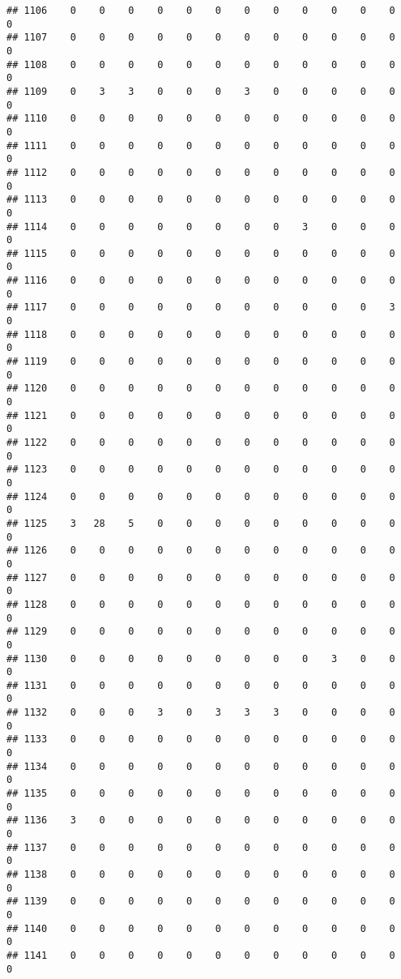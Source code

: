 \documentclass[]{article}
\begin{document}
\begin{verbatim}
## 1106    0    0    0    0    0    0    0    0    0    0    0    0    0
## 1107    0    0    0    0    0    0    0    0    0    0    0    0    0
## 1108    0    0    0    0    0    0    0    0    0    0    0    0    0
## 1109    0    3    3    0    0    0    3    0    0    0    0    0    0
## 1110    0    0    0    0    0    0    0    0    0    0    0    0    0
## 1111    0    0    0    0    0    0    0    0    0    0    0    0    0
## 1112    0    0    0    0    0    0    0    0    0    0    0    0    0
## 1113    0    0    0    0    0    0    0    0    0    0    0    0    0
## 1114    0    0    0    0    0    0    0    0    3    0    0    0    0
## 1115    0    0    0    0    0    0    0    0    0    0    0    0    0
## 1116    0    0    0    0    0    0    0    0    0    0    0    0    0
## 1117    0    0    0    0    0    0    0    0    0    0    0    3    0
## 1118    0    0    0    0    0    0    0    0    0    0    0    0    0
## 1119    0    0    0    0    0    0    0    0    0    0    0    0    0
## 1120    0    0    0    0    0    0    0    0    0    0    0    0    0
## 1121    0    0    0    0    0    0    0    0    0    0    0    0    0
## 1122    0    0    0    0    0    0    0    0    0    0    0    0    0
## 1123    0    0    0    0    0    0    0    0    0    0    0    0    0
## 1124    0    0    0    0    0    0    0    0    0    0    0    0    0
## 1125    3   28    5    0    0    0    0    0    0    0    0    0    0
## 1126    0    0    0    0    0    0    0    0    0    0    0    0    0
## 1127    0    0    0    0    0    0    0    0    0    0    0    0    0
## 1128    0    0    0    0    0    0    0    0    0    0    0    0    0
## 1129    0    0    0    0    0    0    0    0    0    0    0    0    0
## 1130    0    0    0    0    0    0    0    0    0    3    0    0    0
## 1131    0    0    0    0    0    0    0    0    0    0    0    0    0
## 1132    0    0    0    3    0    3    3    3    0    0    0    0    0
## 1133    0    0    0    0    0    0    0    0    0    0    0    0    0
## 1134    0    0    0    0    0    0    0    0    0    0    0    0    0
## 1135    0    0    0    0    0    0    0    0    0    0    0    0    0
## 1136    3    0    0    0    0    0    0    0    0    0    0    0    0
## 1137    0    0    0    0    0    0    0    0    0    0    0    0    0
## 1138    0    0    0    0    0    0    0    0    0    0    0    0    0
## 1139    0    0    0    0    0    0    0    0    0    0    0    0    0
## 1140    0    0    0    0    0    0    0    0    0    0    0    0    0
## 1141    0    0    0    0    0    0    0    0    0    0    0    0    0

\end{verbatim}
\end{document}
